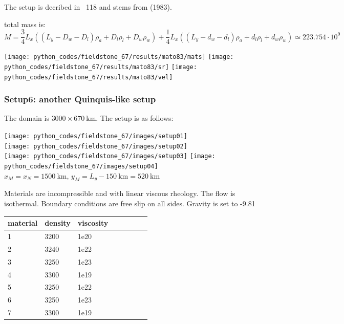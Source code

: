 The setup is decribed in \stone~118 and stems from \textcite{mato83} (1983). 

total mass is:
\[
M=\frac34 L_x \left( (L_y-D_w-D_l) \rho_a + D_l \rho_l + D_w \rho_w \right)
+ \frac14 L_x \left( (L_y-d_w-d_l) \rho_a + d_l \rho_l + d_w \rho_w \right)
\simeq 223.754\cdot10^9 
\]


\begin{center}
\texttt{[image: python\_codes/fieldstone\_67/results/mato83/mats]}
\texttt{[image: python\_codes/fieldstone\_67/results/mato83/sr]}
\texttt{[image: python\_codes/fieldstone\_67/results/mato83/vel]}
\end{center}



\newpage
\subsubsection*{Setup6: another Quinquis-like setup}

The domain is $3000\times 670~\si{\km}$. The setup is as follows:

\begin{center}
\texttt{[image: python\_codes/fieldstone\_67/images/setup01]}\\
\texttt{[image: python\_codes/fieldstone\_67/images/setup02]}\\
\texttt{[image: python\_codes/fieldstone\_67/images/setup03]}
\texttt{[image: python\_codes/fieldstone\_67/images/setup04]}\\
{\captionfont $x_M=x_N=1500~\si{\km}$, $y_M=L_y-150~\si{\km}=520~\si{\km}$}
\end{center}

Materials are incompressible and with linear viscous rheology. The
flow is isothermal. Boundary conditions are free slip on all
sides. Gravity is set to -9.81

\begin{center}
\begin{tabular}{llllllll}
\hline
material & density & viscosity \\
\hline\hline
1& 3200& 1e20\\ 
2& 3240& 1e22\\
3& 3250& 1e23\\
4& 3300& 1e19\\
5& 3250& 1e22\\
6& 3250& 1e23\\
7& 3300& 1e19\\
\hline
\end{tabular}
\end{center}

